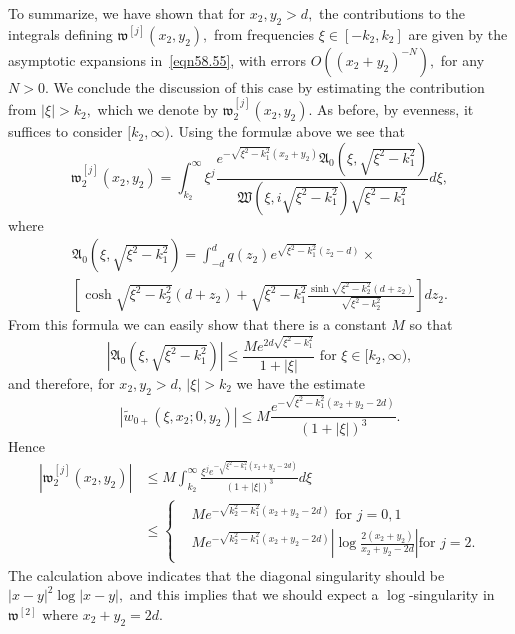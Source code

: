 \documentclass[11pt]{article}
\newcommand\fw{\mathfrak w}
\newcommand\fW{\mathfrak W}
\newcommand\fA{\mathfrak A}
\newcommand\tw{\tilde w_{0+}}
\theoremstyle{definition}
\theoremstyle{remark}
\begin{document}
  To summarize, we have shown that for $x_2,y_2>d,$ the contributions to the
  integrals defining $\fw^{[j]}(x_2,y_2),$ from frequencies $\xi\in [-k_2,k_2]$
  are given by the asymptotic expansions in~\eqref{eqn58.55}, with errors
  $O((x_2+y_2)^{-N}),$ for any $N>0.$ We conclude the discussion of this case by
  estimating the contribution from $|\xi|>k_2,$ which we denote by
  $\fw^{[j]}_2(x_2,y_2).$ As before, by evenness, it suffices to consider
  $[k_2,\infty).$ Using the formul{\ae} above we see that
    \begin{equation}
      \fw_2^{[j]}(x_2,y_2)=
      \int_{k_2}^{\infty}\xi^j\frac{e^{-\sqrt{\xi^2-k_1^2}(x_2+y_2)}\fA_0(\xi,\sqrt{\xi^2-k_1^2})}
                     {\fW(\xi,i\sqrt{\xi^2-k_1^2})\sqrt{\xi^2-k_1^2}}d\xi,
    \end{equation}
    where
    \begin{multline}
      \fA_0(\xi,\sqrt{\xi^2-k_1^2})=\int_{-d}^dq(z_2)e^{\sqrt{\xi^2-k_1^2}(z_2-d)}\times
      \\\left[\cosh\sqrt{\xi^2-k_2^2}(d+z_2)+\sqrt{\xi^2-k_1^2}
        \frac{\sinh\sqrt{\xi^2-k_2^2}(d+z_2)}{\sqrt{\xi^2-k_2^2}}\right]dz_2.
    \end{multline}
    From this formula we can easily show that there is a constant $M$ so that
    \begin{equation}
      |\fA_0(\xi,\sqrt{\xi^2-k_1^2})|\leq
      \frac{Me^{2d\sqrt{\xi^2-k_1^2}}}{1+|\xi|}\text{ for }\xi\in
           [k_2,\infty),
    \end{equation}
    and therefore, for  $x_2,y_2>d,\, |\xi|>k_2$ we have the estimate
    \begin{equation}\label{eqn73.9}
      |\tw(\xi,x_2;0,y_2)|\leq M\frac{e^{-\sqrt{\xi^2-k_1^2}(x_2+y_2-2d)}}{(1+|\xi|)^{3}}.
    \end{equation}
    Hence
    \begin{equation}
      \begin{split}
        | \fw_2^{[j]}(x_2,y_2)|&\leq 
      M\int_{k_2}^{\infty}\frac{\xi^{j}e^{-\sqrt{\xi^2-k_1^2}(x_2+y_2-2d)}}{(1+|\xi|)^3}d\xi\\
      &\leq\begin{cases} &Me^{-\sqrt{k_2^2-k_1^2}(x_2+y_2-2d)}\text{ for }j=0,1\\
      &Me^{-\sqrt{k_2^2-k_1^2}(x_2+y_2-2d)}\left|\log\frac{2(x_2+y_2)}{x_2+y_2-2d}\right|\text{
        for }j=2.
      \end{cases}
      \end{split}
    \end{equation}
  The calculation above indicates that the diagonal singularity should be
  $|x-y|^2\log|x-y|,$ and this implies that we should expect a $\log$-singularity
  in $\fw^{[2]}$ where $x_2+y_2=2d.$
\end{document}
